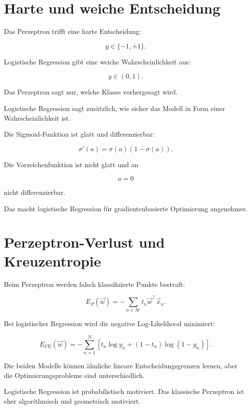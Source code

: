 \section{Harte und weiche Entscheidung}

Das Perzeptron trifft eine harte Entscheidung:

\[
    y \in \{-1,+1\}.
\]

Logistische Regression gibt eine weiche Wahrscheinlichkeit aus:

\[
    y \in (0,1).
\]

\begin{conceptbox}
Das Perzeptron sagt nur, welche Klasse vorhergesagt wird.

Logistische Regression sagt zusätzlich, wie sicher das Modell in Form einer Wahrscheinlichkeit ist.
\end{conceptbox}

Die Sigmoid-Funktion ist glatt und differenzierbar:

\[
    \sigma'(a)
    =
    \sigma(a)(1-\sigma(a)).
\]

Die Vorzeichenfunktion ist nicht glatt und an

\[
    a=0
\]

nicht differenzierbar.

Das macht logistische Regression für gradientenbasierte Optimierung angenehmer.

\section{Perzeptron-Verlust und Kreuzentropie}

Beim Perzeptron werden falsch klassifizierte Punkte bestraft:

\[
    E_P(\vec{w})
    =
    -\sum_{n\in\mathcal{M}}
    t_n\vec{w}^{\top}\vec{x}_n.
\]

Bei logistischer Regression wird die negative Log-Likelihood minimiert:

\[
    E_{\mathrm{CE}}(\vec{w})
    =
    -\sum_{n=1}^{N}
    \left[
        t_n\log y_n
        +
        (1-t_n)\log(1-y_n)
    \right].
\]

\begin{notebox}
Die beiden Modelle können ähnliche lineare Entscheidungsgrenzen lernen, aber die Optimierungsprobleme sind unterschiedlich.

Logistische Regression ist probabilistisch motiviert.
Das klassische Perzeptron ist eher algorithmisch und geometrisch motiviert.
\end{notebox}

